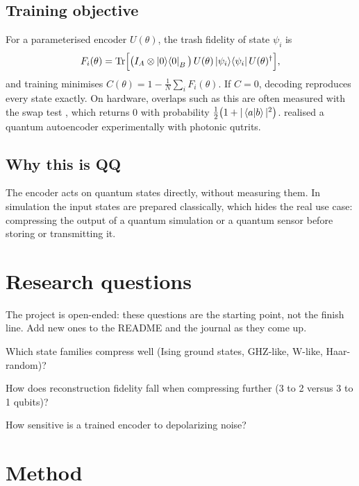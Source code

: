 \documentclass[11pt,a4paper]{article}
\begin{document}
\subsection{Training objective}
For a parameterised encoder $U(\theta)$, the trash fidelity of state $\psi_i$ is
\begin{equation}
  F_i(\theta)=\operatorname{Tr}\!\Big[\big(I_A\otimes\ket{0}\!\bra{0}_B\big)\,U(\theta)\ket{\psi_i}\!\bra{\psi_i}U(\theta)^\dagger\Big],
\end{equation}
and training minimises $C(\theta)=1-\frac1N\sum_iF_i(\theta)$. If $C=0$, decoding reproduces every state
exactly. On hardware, overlaps such as this are often measured with the swap test
\citep{buhrman2001}, which returns 0 with probability $\tfrac12\big(1+|\braket{a|b}|^2\big)$.
\citet{pepper2019} realised a quantum autoencoder experimentally with photonic qutrits.

\subsection{Why this is QQ}
The encoder acts on quantum states directly, without measuring them. In simulation the input states
are prepared classically, which hides the real use case: compressing the output of a quantum
simulation or a quantum sensor before storing or transmitting it.

\section{Research questions}
The project is open-ended: these questions are the starting point, not the finish line. Add new
ones to the README and the journal as they come up.

\begin{rqlist}
  \item Which state families compress well (Ising ground states, GHZ-like, W-like, Haar-random)?
  \item How does reconstruction fidelity fall when compressing further (3 to 2 versus 3 to 1 qubits)?
  \item How sensitive is a trained encoder to depolarizing noise?
\end{rqlist}

\section{Method}
\end{document}
